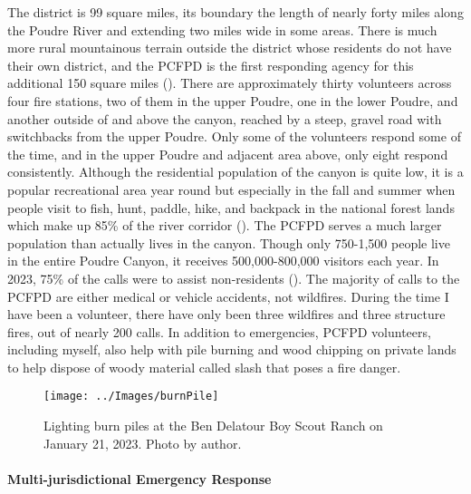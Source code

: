 \documentclass[
]{article}
\begin{document}
The district is 99 square miles, its boundary the length of nearly forty miles along the Poudre River and extending two miles wide in some areas. There is much more rural mountainous terrain outside the district whose residents do not have their own district, and the PCFPD is the first responding agency for this additional 150 square miles (). There are approximately thirty volunteers across four fire stations, two of them in the upper Poudre, one in the lower Poudre, and another outside of and above the canyon, reached by a steep, gravel road with switchbacks from the upper Poudre. Only some of the volunteers respond some of the time, and in the upper Poudre and adjacent area above, only eight respond consistently. Although the residential population of the canyon is quite low, it is a popular recreational area year round but especially in the fall and summer when people visit to fish, hunt, paddle, hike, and backpack in the national forest lands which make up 85\% of the river corridor (). The PCFPD serves a much larger population than actually lives in the canyon. Though only 750-1,500 people live in the entire Poudre Canyon, it receives 500,000-800,000 visitors each year. In 2023, 75\% of the calls were to assist non-residents (). The majority of calls to the PCFPD are either medical or vehicle accidents, not wildfires. During the time I have been a volunteer, there have only been three wildfires and three structure fires, out of nearly 200 calls. In addition to emergencies, PCFPD volunteers, including myself, also help with pile burning and wood chipping on private lands to help dispose of woody material called slash that poses a fire danger.

\begin{figure}
\texttt{[image: ../Images/burnPile]} \caption[Burn piles]{Lighting burn piles at the Ben Delatour Boy Scout Ranch on January 21, 2023. Photo by author.}\label{fig:figureTitle10}
\end{figure}

\paragraph{Multi-jurisdictional Emergency Response}\label{multi-jurisdictional-emergency-response}
\end{document}

